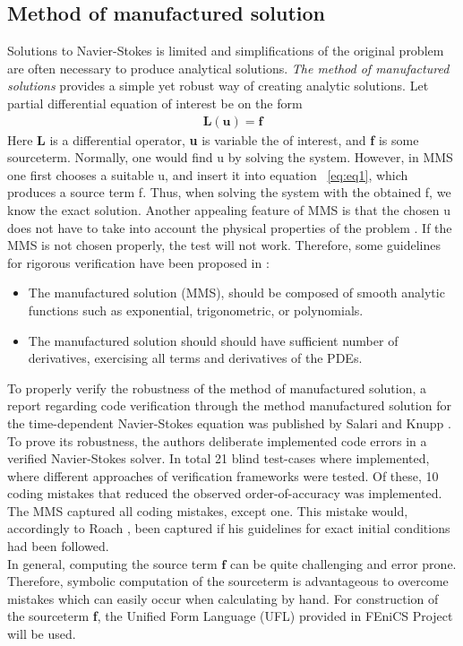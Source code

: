 \subsection{Method of manufactured solution}
Solutions to Navier-Stokes is limited and simplifications of the original problem are often necessary to produce analytical solutions. \textit{The method of manufactured solutions} provides a simple yet robust way of creating analytic solutions. Let partial differential equation of interest be on the form
\begin{align*}
\textbf{L}(\textbf{u}) = \textbf{f}
\label{eq:eq1}
\end{align*}
Here \textbf{L} is a differential operator, \textbf{u} is variable the of interest, and \textbf{f} is some sourceterm. Normally, one would find u by solving the system. However, in MMS one first chooses a suitable u, and insert it into equation ~\ref{eq:eq1}, which produces a source term f. Thus, when solving the system with the obtained f, we know the exact solution. Another appealing feature of MMS is that the chosen u does not have to take into account the physical properties of the problem \cite{Roache2002}. 
\newpage
If the MMS is not chosen properly, the test will not work. Therefore, some guidelines for rigorous verification have been proposed in \cite{Etienne2006, Biggs, Roache2002}:
\begin{itemize}
\item The manufactured solution (MMS), should be composed of smooth analytic functions such as exponential, trigonometric, or polynomials.
\item The manufactured solution should should have sufficient number of derivatives, exercising all terms and derivatives of the PDEs. 
\end{itemize}
To properly verify the robustness of the method of manufactured solution, a report regarding code verification through the method manufactured solution for the time-dependent Navier-Stokes equation was published by Salari and Knupp \cite{Biggs}.  To prove its robustness, the authors deliberate implemented  code errors in a verified Navier-Stokes solver. In total 21 blind test-cases where implemented, where different approaches of verification frameworks were tested.  Of these, 10 coding mistakes that reduced the observed order-of-accuracy was implemented. The MMS captured all coding mistakes, except one. This mistake would, accordingly to Roach \cite{Biggs}, been captured if his guidelines for exact initial conditions had been followed. \\
In general, computing the source term $\mathbf{f}$ can be quite challenging and error prone.  Therefore, symbolic computation of the sourceterm is advantageous to overcome mistakes which can easily occur when calculating by hand. For construction of the sourceterm \textbf{f}, the Unified Form Language (UFL) \cite{Alnes2015} provided in FEniCS Project will be used. 
